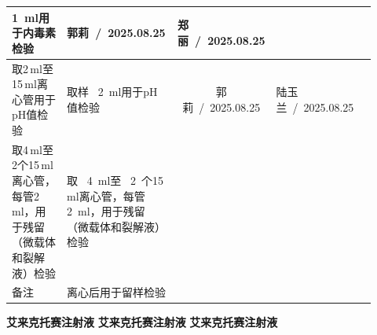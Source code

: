 \documentclass[UTF8,10pt,a4paper,fontset=fandol]{ctexart}
\newcommand{\fieldvalue}[1]{#1}
\newcommand{\handwritten}[1]{#1}
\begin{document}
\begin{tabular}{|p{0.16\linewidth}|p{0.31\linewidth}|p{0.16\linewidth}|p{0.29\linewidth}|}
\fieldvalue{\handwritten{1}}\ ml用于内毒素检验 &
\fieldvalue{\handwritten{郭莉\ /\ 2025.08.25}} &
\fieldvalue{\handwritten{郑丽\ /\ 2025.08.25}} \\
\hline
取2\,ml至15\,ml离心管用于pH值检验 &
取样\ 
\fieldvalue{\handwritten{2}}\ ml用于pH值检验 &
\multicolumn{1}{c|}{
\fieldvalue{\handwritten{郭莉\ /\ 2025.08.25}}} &
\fieldvalue{\handwritten{陆玉兰\ /\ 2025.08.25}} \\
\hline
取4\,ml至2个15\,ml离心管，每管2\,ml，用于残留（微载体和裂解液）检验 &
取\ 
\fieldvalue{\handwritten{4}}\ ml至\ 
\fieldvalue{\handwritten{2}}\ 个15\,ml离心管，每管\ 
\fieldvalue{\handwritten{2}}\ ml，用于残留（微载体和裂解液）检验 &
\multicolumn{2}{c|}{} \\
\hline
备注 &
\multicolumn{3}{l|}{
\fieldvalue{\handwritten{离心后用于留样检验}}} \\
\hline
\end{tabular}

\vspace{1em}

\noindent
\textbf{艾来克托赛注射液}\qquad
\textbf{艾来克托赛注射液}\qquad
\textbf{艾来克托赛注射液}

\medskip
\end{document}
